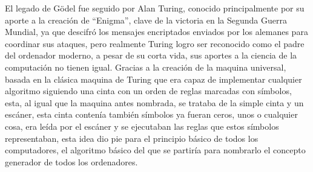 \documentclass[12pt]{article}
\begin{document}
\begin{flushleft}
\vspace{15PT}
El legado de Gödel fue seguido por Alan Turing, conocido principalmente por su aporte a la creación de “Enigma”, clave de la victoria en la Segunda Guerra Mundial, ya que descifró los mensajes encriptados enviados por los alemanes para coordinar sus ataques, pero realmente Turing logro ser reconocido como el padre del ordenador moderno, a pesar de su corta vida, sus aportes a la ciencia de la computación no tienen igual. Gracias a la creación de la maquina universal, basada en la clásica maquina de Turing que era capaz de implementar cualquier algoritmo siguiendo una cinta con un orden de reglas marcadas con símbolos, esta, al igual que la maquina antes nombrada, se trataba de la simple cinta y un escáner, esta cinta contenía también símbolos ya fueran ceros, unos o cualquier cosa, era leída por el escáner y se ejecutaban las reglas que estos símbolos representaban, esta idea dio pie para el principio básico de todos los computadores, el algoritmo básico del que se partiría para nombrarlo el concepto generador de todos los ordenadores.
 \end{flushleft}
 \newpage

 


 
\end{document}
